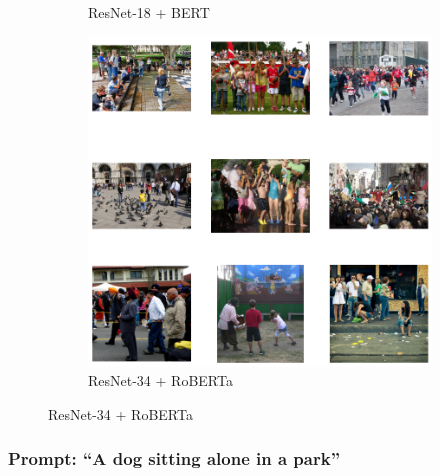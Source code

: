 \documentclass[11pt]{article}
\begin{document}
\begin{figure}[H]
\begin{subfigure}[b]{0.3\textwidth}
        \caption{\tiny ResNet-18 + BERT}
    \end{subfigure}
    \hfill
    \begin{subfigure}[b]{0.3\textwidth}
        \includegraphics[width=\linewidth]{Q2/A crowd gathered in a park/3.png}
        \caption{\tiny ResNet-34 + RoBERTa}
    \end{subfigure}
    
\end{figure}

\subsubsection{Prompt: ``A dog sitting alone in a park''}
\vspace{0.5em}
\end{document}
